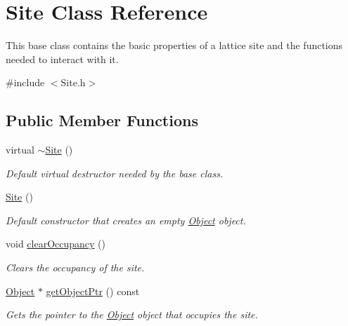 \hypertarget{class_site}{}\section{Site Class Reference}
\label{class_site}


This base class contains the basic properties of a lattice site and the functions needed to interact with it.  




{\ttfamily \#include $<$Site.\+h$>$}

\subsection*{Public Member Functions}
\begin{DoxyCompactItemize}
\item 
\mbox{\label{class_site_a81f7ae39aaa7a981a6871c4816ee5562}} 
virtual \hyperlink{class_site_a81f7ae39aaa7a981a6871c4816ee5562}{$\sim$\+Site} ()
\begin{DoxyCompactList}\small\item\em Default virtual destructor needed by the base class. \end{DoxyCompactList}\item 
\mbox{\label{class_site_a4119f95c45d57d6edf419169dea993f4}} 
\hyperlink{class_site_a4119f95c45d57d6edf419169dea993f4}{Site} ()
\begin{DoxyCompactList}\small\item\em Default constructor that creates an empty \hyperlink{class_object}{Object} object. \end{DoxyCompactList}\item 
void \hyperlink{class_site_a46ff077954e39046b493ee1ea57a9c93}{clear\+Occupancy} ()
\begin{DoxyCompactList}\small\item\em Clears the occupancy of the site. \end{DoxyCompactList}\item 
\mbox{\label{class_site_aecb14e440914b4d3d4aa7294419791e2}} 
\hyperlink{class_object}{Object} $\ast$ \hyperlink{class_site_aecb14e440914b4d3d4aa7294419791e2}{get\+Object\+Ptr} () const
\begin{DoxyCompactList}\small\item\em Gets the pointer to the \hyperlink{class_object}{Object} object that occupies the site. \end{DoxyCompactList}\item 

\end{DoxyCompactItemize}
